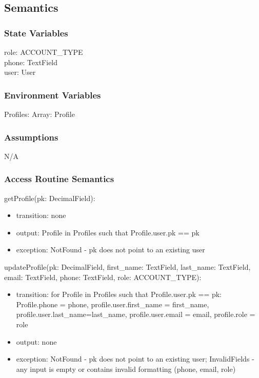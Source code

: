 \documentclass[12pt, titlepage]{article}
\begin{document}
\subsection{Semantics}

\subsubsection{State Variables}
role: ACCOUNT\_TYPE\\
phone: TextField\\
user: User

\subsubsection{Environment Variables}
Profiles: Array: Profile

\subsubsection{Assumptions}
N/A

\subsubsection{Access Routine Semantics}

\noindent getProfile(pk: DecimalField):
\begin{itemize}
    \item transition: none
    \item output: Profile in Profiles such that Profile.user.pk == pk
    \item exception: NotFound - pk does not point to an existing user
\end{itemize}

\noindent updateProfile(pk: DecimalField, first\_name: TextField, last\_name: TextField, email: TextField, phone: TextField, role: ACCOUNT\_TYPE):
\begin{itemize}
    \item transition: for Profile in Profiles such that Profile.user.pk == pk: Profile.phone = phone, profile.user.first\_name = first\_name, profile.user.last\_name=last\_name, profile.user.email = email,
    profile.role = role
    \item output: none
    \item exception: NotFound - pk does not point to an existing user; InvalidFields - any input is empty or contains invalid formatting (phone, email, role)
\end{itemize}
\end{document}
